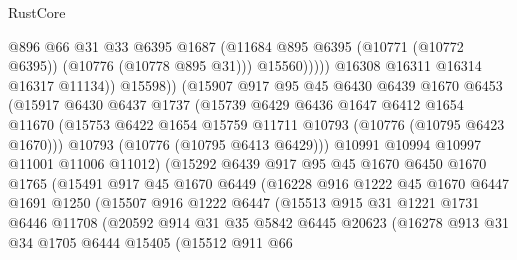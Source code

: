 \begin{lexlean}{RustCore}
\begin{coremodule}
                              @896
                              @66
                              @31
                              @33
                              @6395
                              @1687
                              (@11684 @895 @6395 (@10771 (@10772 @6395)) (@10776 (@10778 @895 @31)))
                              @15560)))))
                    @16308
                    @16311
                    @16314
                    @16317
                    @11134))
                @15598))
            (@15907
              @917
              @95
              @45
              @6430
              @6439
              @1670
              @6453
              (@15917
                @6430
                @6437
                @1737
                (@15739
                  @6429
                  @6436
                  @1647
                  @6412
                  @1654
                  @11670
                  (@15753 @6422 @1654 @15759 @11711 @10793 (@10776 (@10795 @6423 @1670)))
                  @10793
                  (@10776 (@10795 @6413 @6429)))
                @10991
                @10994
                @10997
                @11001
                @11006
                @11012)
              (@15292
                @6439
                @917
                @95
                @45
                @1670
                @6450
                @1670
                @1765
                (@15491
                  @917
                  @45
                  @1670
                  @6449
                  (@16228
                    @916
                    @1222
                    @45
                    @1670
                    @6447
                    @1691
                    @1250
                    (@15507
                      @916
                      @1222
                      @6447
                      (@15513
                        @915
                        @31
                        @1221
                        @1731
                        @6446
                        @11708
                        (@20592
                          @914
                          @31
                          @35
                          @5842
                          @6445
                          @20623
                          (@16278
                            @913
                            @31
                            @34
                            @1705
                            @6444
                            @15405
                            (@15512
                              @911
                              @66

\end{coremodule}
\end{lexlean}
